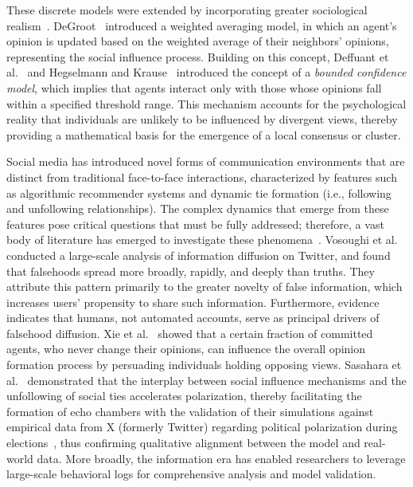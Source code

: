 \documentclass[pdflatex,sn-mathphys-num]{sn-jnl}%
\theoremstyle{thmstyleone}%
\theoremstyle{thmstyletwo}%
\theoremstyle{thmstylethree}%
\begin{document}
These discrete models were extended by incorporating greater
sociological realism~\cite{DeGroot1974,Friedkin1990,Deffuant2000,Hegselmann2002}. DeGroot~\cite{DeGroot1974} introduced a weighted
averaging model, in which an agent's opinion is updated based on the
weighted average of their neighbors' opinions, representing the
social influence process. Building on this concept, Deffuant et al.~\cite{Deffuant2000} and Hegselmann and Krause~\cite{Hegselmann2002}
introduced the concept of a \emph{bounded confidence model}, which
implies that agents interact only with those whose opinions fall
within a specified threshold range. This mechanism accounts for
the psychological reality that individuals are unlikely to be influenced
by divergent views, thereby providing a mathematical basis for the emergence
of a local consensus or cluster.
\par



Social media has introduced novel forms of communication
environments that are distinct from traditional face-to-face interactions,
characterized by features such as algorithmic recommender systems and
dynamic tie formation (i.e., following and unfollowing
relationships). The complex dynamics that emerge from these features pose
critical questions that must be fully addressed; therefore, a
vast body of literature has emerged to investigate these
phenomena~\cite{Watts2007,Lazer2009,Golder2011,Bond2012,Bakshy2015,DelVicario2016,Vosoughi2018,Sasahara2021,Conover2011}. Vosoughi
et al.~\cite{Vosoughi2018} conducted a large-scale analysis of
information diffusion on Twitter, and found that falsehoods spread more
broadly, rapidly, and deeply than truths. They attribute this pattern
primarily to the greater novelty of false information, which increases
users’ propensity to share such information. Furthermore, evidence indicates
that humans, not automated accounts, serve as principal drivers
of falsehood diffusion. 
Xie et al.~\cite{Xie2011} showed that a certain fraction 
of committed agents, who never change their opinions, 
can influence the overall opinion formation process by persuading 
individuals holding opposing views.
Sasahara et al.~\cite{Sasahara2021}
demonstrated that the interplay between social influence mechanisms
and the unfollowing of social ties accelerates polarization, thereby facilitating
the formation of echo chambers with the validation of their simulations
against empirical data from X (formerly Twitter) regarding
political polarization during elections~\cite{Conover2011}, thus confirming
qualitative alignment between the model and real-world data. More broadly,
the information era has enabled researchers to leverage large-scale
behavioral logs for comprehensive analysis and model validation. 
\par
\end{document}

